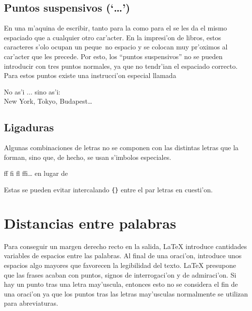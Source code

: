 
\subsection{Puntos suspensivos (`\ldots')}

En una m'aquina de escribir, tanto para la  como para el
 se les da el mismo espaciado que a cualquier otro
car'acter. En la impresi'on de libros, estos caracteres s'olo ocupan
un peque~no espacio y se colocan muy pr'oximos al car'acter que les
precede. Por esto, los ``puntos suspensivos'' no se pueden introducir
con tres puntos normales, ya que no tendr'ian el espaciado correcto.
Para estos puntos existe una instrucci'on especial llamada
\begin{command}
\end{command}
\begin{example}
No as'i ... sino as'i:\\
New York, Tokyo, Budapest\ldots
\end{example}

\subsection{Ligaduras}

Algunas combinaciones de letras no se componen con las distintas
letras que la forman, sino que, de hecho, se usan s'imbolos
especiales.
\begin{code}
{\large ff fi fl ffi\ldots}\quad
en lugar de
\end{code}
Estas  se pueden evitar intercalando \verb|{}|
entre el par letras en cuesti'on.





\section{Distancias entre palabras}

Para conseguir un margen derecho recto en la salida, \LaTeX{}
introduce cantidades variables de espacios entre las palabras. Al
final de una oraci'on, introduce unos espacios algo mayores que
favorecen la legibilidad del texto. \LaTeX{} presupone que las frases
acaban con puntos, signos de interrogaci'on y de admiraci'on. Si hay
un punto tras una letra may'uscula, entonces esto no se considera el
fin de una oraci'on ya que los puntos tras las letras may'usculas
normalmente se utilizan para abreviaturas.

